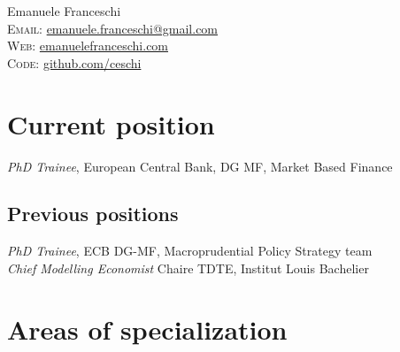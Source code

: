 \documentclass[12pt, a4paper]{article} %
\newcommand{\years}[1]{\marginnote{\scriptsize #1}} %
\begin{document}

{\LARGE Emanuele Franceschi}\\%
\textsc{Email:} \href{mailto:emanuele.franceschi@gmail.com}{emanuele.franceschi@gmail.com}\\ %
\textsc{Web}: \href{https://www.emanuelefranceschi.com}{emanuelefranceschi.com} \\%
\textsc{Code}: \href{https://github.com/ceschi}{github.com/ceschi}\\


\section*{Current position}
\emph{PhD Trainee}, European Central Bank, DG MF, Market Based Finance\\

\subsection*{Previous positions}
\years{2022} \emph{PhD Trainee}, ECB DG-MF, Macroprudential Policy Strategy team\\
\years{2021 /22} \emph{Chief Modelling Economist} Chaire TDTE, Institut Louis Bachelier\\


\section*{Areas of specialization}
\end{document}
